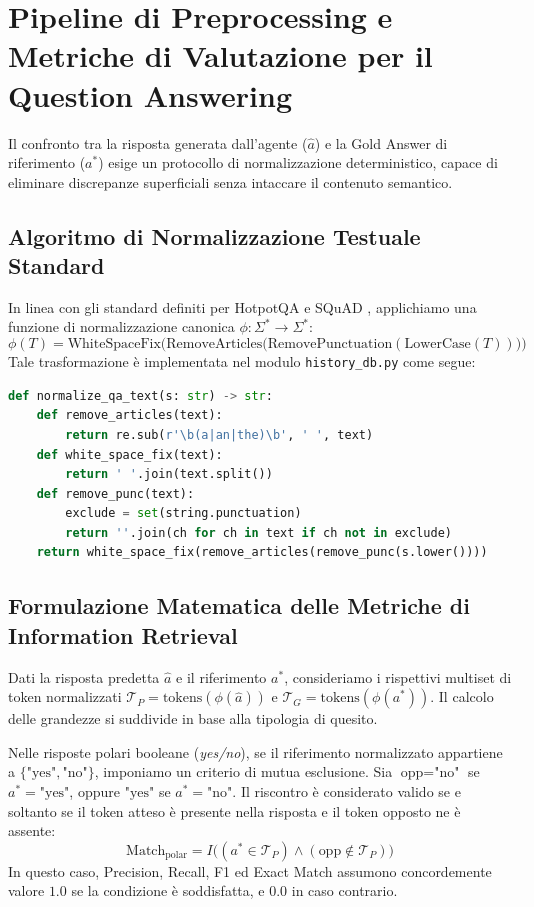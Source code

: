 \section{Pipeline di Preprocessing e Metriche di Valutazione per il Question Answering}
\label{sec:preprocessing_metriche}

Il confronto tra la risposta generata dall'agente ($\hat{a}$) e la Gold Answer di riferimento ($a^*$) esige un protocollo di normalizzazione deterministico, capace di eliminare discrepanze superficiali senza intaccare il contenuto semantico.

\subsection{Algoritmo di Normalizzazione Testuale Standard}
In linea con gli standard definiti per HotpotQA e SQuAD \cite{rajpurkar2016squad, yang2018hotpotqa}, applichiamo una funzione di normalizzazione canonica $\phi: \Sigma^* \rightarrow \Sigma^*$:
\begin{equation}
\phi(T) = \text{WhiteSpaceFix}\Big(\text{RemoveArticles}\big(\text{RemovePunctuation}(\text{LowerCase}(T))\big)\Big)
\end{equation}
Tale trasformazione è implementata nel modulo \texttt{history\_db.py} come segue:
\begin{lstlisting}[language=Python]
def normalize_qa_text(s: str) -> str:
    def remove_articles(text):
        return re.sub(r'\b(a|an|the)\b', ' ', text)
    def white_space_fix(text):
        return ' '.join(text.split())
    def remove_punc(text):
        exclude = set(string.punctuation)
        return ''.join(ch for ch in text if ch not in exclude)
    return white_space_fix(remove_articles(remove_punc(s.lower())))
\end{lstlisting}

\subsection{Formulazione Matematica delle Metriche di Information Retrieval}
Dati la risposta predetta $\hat{a}$ e il riferimento $a^*$, consideriamo i rispettivi multiset di token normalizzati $\mathcal{T}_P = \text{tokens}(\phi(\hat{a}))$ e $\mathcal{T}_G = \text{tokens}(\phi(a^*))$. Il calcolo delle grandezze si suddivide in base alla tipologia di quesito.

Nelle risposte polari booleane (\textit{yes/no}), se il riferimento normalizzato appartiene a $\{ \text{"yes"}, \text{"no"} \}$, imponiamo un criterio di mutua esclusione. Sia $\text{opp} = \text{"no"}$ se $a^* = \text{"yes"}$, oppure $\text{"yes"}$ se $a^* = \text{"no"}$. Il riscontro è considerato valido se e soltanto se il token atteso è presente nella risposta e il token opposto ne è assente:
\begin{equation}
\text{Match}_{\text{polar}} = {I}\big( (a^* \in \mathcal{T}_P) \land (\text{opp} \notin \mathcal{T}_P) \big)
\end{equation}
In questo caso, Precision, Recall, F1 ed Exact Match assumono concordemente valore $1.0$ se la condizione è soddisfatta, e $0.0$ in caso contrario.

